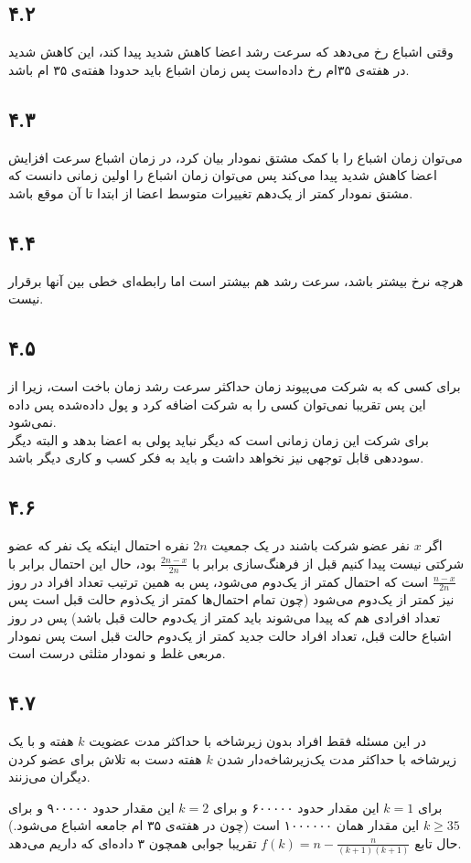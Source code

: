 \documentclass[12pt,a4paper]{article}
\begin{document}
\subsection*{۴.۲}
وقتی اشباع رخ می‌دهد که سرعت رشد اعضا کاهش شدید پیدا کند، این کاهش شدید در هفته‌ی ۳۵ام رخ داده‌است پس زمان اشباع باید حدودا هفته‌ی ۳۵ ام باشد.
\subsection*{۴.۳}
می‌توان زمان اشباع را با کمک مشتق نمودار بیان کرد، در زمان اشباع سرعت افزایش اعضا کاهش شدید پیدا می‌کند پس می‌توان زمان اشباع را اولین زمانی دانست که مشتق نمودار  کمتر از یک‌دهم تغییرات متوسط اعضا از ابتدا تا آن موقع باشد.
\subsection*{۴.۴}
هرچه نرخ بیشتر باشد، سرعت رشد هم بیشتر است اما رابطه‌ای خطی بین آنها برقرار نیست.
\subsection*{۴.۵}
برای کسی که به شرکت می‌پیوند زمان حداکثر سرعت رشد زمان باخت است، زیرا از این پس تقریبا نمی‌توان کسی را به شرکت اضافه کرد و پول داده‌شده پس داده نمی‌شود.
\\
برای شرکت این زمان زمانی است که دیگر نباید پولی به اعضا بدهد و البته دیگر سود‌دهی قابل توجهی نیز نخواهد داشت و باید به فکر کسب و کاری دیگر باشد.
\subsection*{۴.۶}
اگر $x$ نفر عضو شرکت باشند در یک جمعیت $2n$ نفره احتمال اینکه یک نفر که عضو شرکتی نیست پیدا کنیم قبل از فرهنگ‌سازی برابر با 
$\frac{2n-x}{2n}$
بود، حال این احتمال برابر با 
$\frac{n-x}{2n}$
است که احتمال کمتر از یک‌دوم می‌شود، پس به همین ترتیب تعداد افراد در روز نیز کمتر از یک‌دوم می‌شود (چون تمام احتمال‌ها کمتر از یک‌ذوم حالت قبل است پس تعداد افرادی هم که پیدا می‌شوند باید کمتر از یک‌دوم حالت قبل باشد)  پس در روز اشباع حالت قبل، تعداد افراد حالت جدید کمتر از یک‌دوم حالت قبل است پس نمودار مربعی غلط و نمودار مثلثی درست است.
\subsection*{۴.۷}
در این مسئله فقط افراد بدون زیرشاخه با حداکثر مدت عضویت $k$ هفته و با یک زیرشاخه با حداکثر مدت یک‌زیرشاخه‌دار شدن $k$ هفته دست به تلاش برای عضو کردن دیگران می‌زنند.

برای $k=1$ این مقدار حدود ۶۰۰۰۰۰ و برای $k=2$ این مقدار حدود  ۹۰۰۰۰۰ و برای $k\geq35$ این مقدار همان ۱۰۰۰۰۰۰ است (چون در هفته‌ی ۳۵ ام جامعه اشباع می‌شود.)
حال تابع
$f(k) = n - \frac{n}{(k+1)(k+1)}$
تقریبا جوابی همچون ۳ داده‌ای که داریم می‌دهد.
\end{document}
